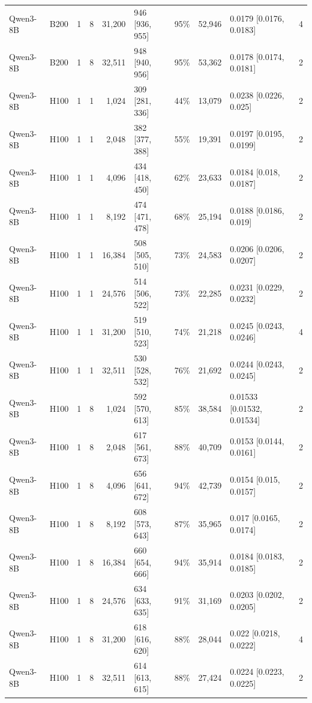 \begin{landscape}
\begin{longtable}{llrrrlrrlr}
Qwen3-8B & B200 & 1 & 8 & 31,200 & 946 {[}936, 955{]} & 95\% & 52,946 & 0.0179 {[}0.0176, 0.0183{]} & 4 \\
Qwen3-8B & B200 & 1 & 8 & 32,511 & 948 {[}940, 956{]} & 95\% & 53,362 & 0.0178 {[}0.0174, 0.0181{]} & 2 \\
Qwen3-8B & H100 & 1 & 1 & 1,024 & 309 {[}281, 336{]} & 44\% & 13,079 & 0.0238 {[}0.0226, 0.025{]} & 2 \\
Qwen3-8B & H100 & 1 & 1 & 2,048 & 382 {[}377, 388{]} & 55\% & 19,391 & 0.0197 {[}0.0195, 0.0199{]} & 2 \\
Qwen3-8B & H100 & 1 & 1 & 4,096 & 434 {[}418, 450{]} & 62\% & 23,633 & 0.0184 {[}0.018, 0.0187{]} & 2 \\
Qwen3-8B & H100 & 1 & 1 & 8,192 & 474 {[}471, 478{]} & 68\% & 25,194 & 0.0188 {[}0.0186, 0.019{]} & 2 \\
Qwen3-8B & H100 & 1 & 1 & 16,384 & 508 {[}505, 510{]} & 73\% & 24,583 & 0.0206 {[}0.0206, 0.0207{]} & 2 \\
Qwen3-8B & H100 & 1 & 1 & 24,576 & 514 {[}506, 522{]} & 73\% & 22,285 & 0.0231 {[}0.0229, 0.0232{]} & 2 \\
Qwen3-8B & H100 & 1 & 1 & 31,200 & 519 {[}510, 523{]} & 74\% & 21,218 & 0.0245 {[}0.0243, 0.0246{]} & 4 \\
Qwen3-8B & H100 & 1 & 1 & 32,511 & 530 {[}528, 532{]} & 76\% & 21,692 & 0.0244 {[}0.0243, 0.0245{]} & 2 \\
Qwen3-8B & H100 & 1 & 8 & 1,024 & 592 {[}570, 613{]} & 85\% & 38,584 & 0.01533 {[}0.01532, 0.01534{]} & 2 \\
Qwen3-8B & H100 & 1 & 8 & 2,048 & 617 {[}561, 673{]} & 88\% & 40,709 & 0.0153 {[}0.0144, 0.0161{]} & 2 \\
Qwen3-8B & H100 & 1 & 8 & 4,096 & 656 {[}641, 672{]} & 94\% & 42,739 & 0.0154 {[}0.015, 0.0157{]} & 2 \\
Qwen3-8B & H100 & 1 & 8 & 8,192 & 608 {[}573, 643{]} & 87\% & 35,965 & 0.017 {[}0.0165, 0.0174{]} & 2 \\
Qwen3-8B & H100 & 1 & 8 & 16,384 & 660 {[}654, 666{]} & 94\% & 35,914 & 0.0184 {[}0.0183, 0.0185{]} & 2 \\
Qwen3-8B & H100 & 1 & 8 & 24,576 & 634 {[}633, 635{]} & 91\% & 31,169 & 0.0203 {[}0.0202, 0.0205{]} & 2 \\
Qwen3-8B & H100 & 1 & 8 & 31,200 & 618 {[}616, 620{]} & 88\% & 28,044 & 0.022 {[}0.0218, 0.0222{]} & 4 \\
Qwen3-8B & H100 & 1 & 8 & 32,511 & 614 {[}613, 615{]} & 88\% & 27,424 & 0.0224 {[}0.0223, 0.0225{]} & 2 \\

\end{longtable}
\end{landscape}
